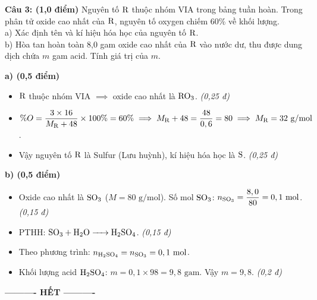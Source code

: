 \documentclass[11pt,a4paper]{article}
\begin{document}
\vspace{4pt}
\noindent
\textbf{Câu 3: (1,0 điểm)} Nguyên tố $\ce{R}$ thuộc nhóm VIA trong bảng tuần hoàn. Trong phân tử oxide cao nhất của $\ce{R}$, nguyên tố oxygen chiếm 60\% về khối lượng.\\
a) Xác định tên và kí hiệu hóa học của nguyên tố $\ce{R}$.\\
b) Hòa tan hoàn toàn 8,0 gam oxide cao nhất của $\ce{R}$ vào nước dư, thu được dung dịch chứa $m$ gam acid. Tính giá trị của $m$.

\begin{tcolorbox}[colback=white,colframe=solBlue,title=\textbf{Lời giải chi tiết và Biểu điểm Câu 3:}]
\textbf{a) (0,5 điểm)}
\begin{itemize}[leftmargin=1.2cm]
\item $\ce{R}$ thuộc nhóm VIA $\implies$ oxide cao nhất là $\ce{RO3}$. \hfill \textit{(0,25 đ)}
\item $\%O = \dfrac{3 \times 16}{M_{\ce{R}} + 48} \times 100\% = 60\% \implies M_{\ce{R}} + 48 = \dfrac{48}{0,6} = 80 \implies M_{\ce{R}} = 32\text{ g/mol}$.
\item Vậy nguyên tố $\ce{R}$ là Sulfur (Lưu huỳnh), kí hiệu hóa học là $\ce{S}$. \hfill \textit{(0,25 đ)}
\end{itemize}
\textbf{b) (0,5 điểm)}
\begin{itemize}[leftmargin=1.2cm]
\item Oxide cao nhất là $\ce{SO3}$ ($M = 80\text{ g/mol}$). Số mol $\ce{SO3}$: $n_{\ce{SO3}} = \dfrac{8,0}{80} = 0,1\text{ mol}$. \hfill \textit{(0,15 đ)}
\item PTHH: $\ce{SO3 + H2O -> H2SO4}$. \hfill \textit{(0,15 đ)}
\item Theo phương trình: $n_{\ce{H2SO4}} = n_{\ce{SO3}} = 0,1\text{ mol}$.
\item Khối lượng acid $\ce{H2SO4}$: $m = 0,1 \times 98 = 9,8\text{ gam}$. Vậy $m = 9,8$. \hfill \textit{(0,2 đ)}
\end{itemize}
\end{tcolorbox}

\vspace{6pt}
\begin{center}
\textbf{\large ---------- HẾT ----------}
\end{center}
\end{document}

